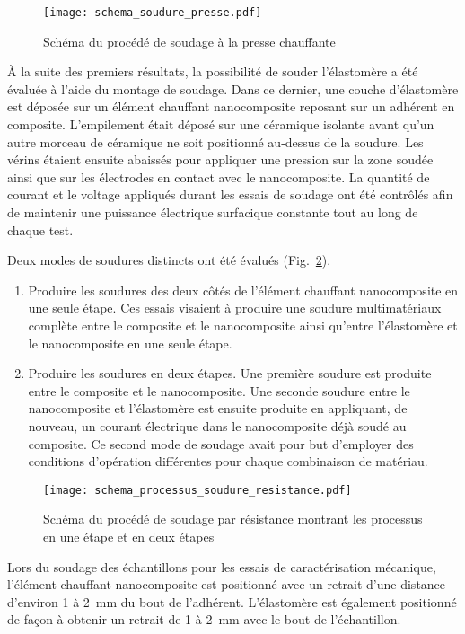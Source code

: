 \begin{figure}[h]
	\centering
	\texttt{[image: schema\_soudure\_presse.pdf]}
	\caption{Schéma du procédé de soudage à la presse chauffante}
	\label{fig:schema_soudure_presse}
\end{figure}

À la suite des premiers résultats, la possibilité de souder l'élastomère a été évaluée à l'aide du montage de soudage. 
Dans ce dernier, une couche d'élastomère est déposée sur un élément chauffant nanocomposite reposant sur un adhérent en composite. 
L'empilement était déposé sur une céramique isolante avant qu'un autre morceau de céramique ne soit positionné au-dessus de la soudure. 
Les vérins étaient ensuite abaissés pour appliquer une pression sur la zone soudée ainsi que sur les électrodes en contact avec le nanocomposite. 
La quantité de courant et le voltage appliqués durant les essais de soudage ont été contrôlés afin de maintenir une puissance électrique surfacique constante tout au long de chaque test. 

Deux modes de soudures distincts ont été évalués (Fig.~\ref{fig:schema_processus_soudure_resistance}). 
\begin{enumerate}
	\item Produire les soudures des deux côtés de l'élément chauffant nanocomposite en une seule étape. 
	Ces essais visaient à produire une soudure multimatériaux complète entre le composite et le nanocomposite ainsi qu'entre l'élastomère et le nanocomposite en une seule étape. 
	\item Produire les soudures en deux étapes. 
	Une première soudure est produite entre le composite et le nanocomposite. 
	Une seconde soudure entre le nanocomposite et l'élastomère est ensuite produite en appliquant, de nouveau, un courant électrique dans le nanocomposite déjà soudé au composite. 
	Ce second mode de soudage avait pour but d'employer des conditions d'opération différentes pour chaque combinaison de matériau. 
\end{enumerate}

\begin{figure}[h]
	\centering
	\texttt{[image: schema\_processus\_soudure\_resistance.pdf]}
	\caption{Schéma du procédé de soudage par résistance montrant les processus en une étape et en deux étapes}
	\label{fig:schema_processus_soudure_resistance}
\end{figure}
\FloatBarrier

Lors du soudage des échantillons pour les essais de caractérisation mécanique, l'élément chauffant nanocomposite est positionné avec un retrait d'une distance d'environ 1 à \SI[locale=FR]{2}{\milli\metre} du bout de l'adhérent. 
L'élastomère est également positionné de façon à obtenir un retrait de 1 à \SI[locale=FR]{2}{\milli\metre} avec le bout de l'échantillon. 

